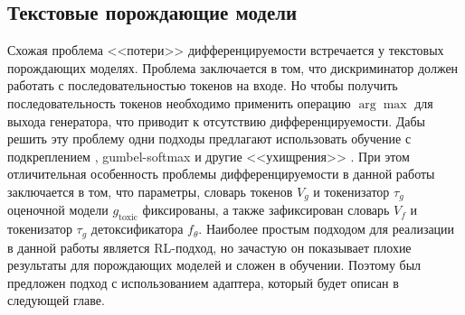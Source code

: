 \subsection{Текстовые порождающие модели}
Схожая проблема <<потери>> дифференцируемости встречается у текстовых порождающих моделях. 
Проблема заключается в том, что дискриминатор должен работать с последовательностью токенов на входе. 
Но чтобы получить последовательность токенов необходимо применить операцию $\arg\max$ для выхода генератора, что приводит к отсутствию дифференцируемости. 
Дабы решить эту проблему одни подходы предлагают использовать обучение с подкреплением \cite{Yu_Zhang_Wang_Yu_2017}, gumbel-softmax \cite{kusner2016gans} и другие <<ухищрения>> \cite{gan-wo-rl, gan-bert}.
При этом отличительная особенность проблемы дифференцируемости в данной работы заключается в том, что параметры, словарь токенов $V_{g}$ и токенизатор $\tau_{g}$ оценочной модели $g_{\text{toxic}}$ фиксированы, а также зафиксирован словарь $V_{f}$ и токенизатор $\tau_{g}$ детоксификатора $f_{\theta}$. 
Наиболее простым подходом для реализации в данной работы является RL-подход, но зачастую он показывает плохие результаты для порождающих моделей и сложен в обучении.
Поэтому был предложен подход с использованием адаптера, который будет описан в следующей главе. 

